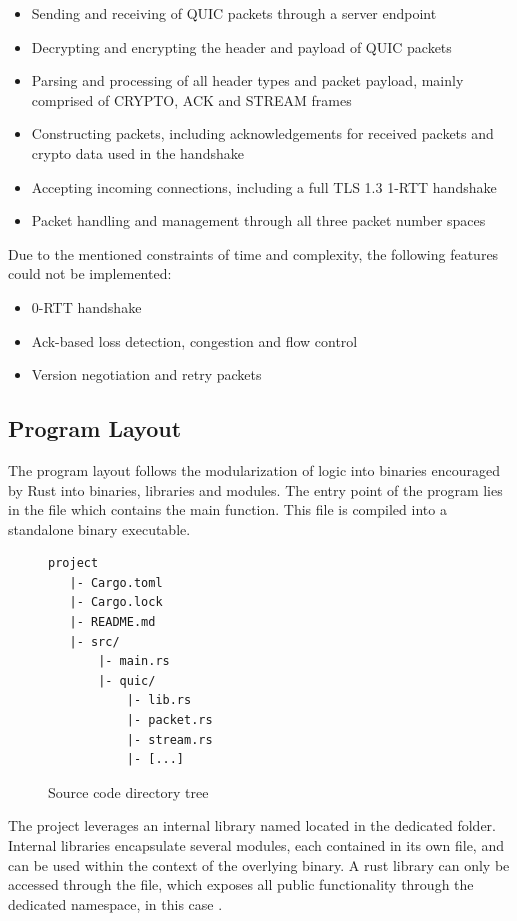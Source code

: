 \begin{itemize}
    \item Sending and receiving of QUIC packets through a server endpoint
    \item Decrypting and encrypting the header and payload of QUIC packets
    \item Parsing and processing of all header types and packet payload, mainly comprised of CRYPTO, ACK and STREAM frames
    \item Constructing packets, including acknowledgements for received packets and crypto data used in the handshake
    \item Accepting incoming connections, including a full TLS 1.3 1-RTT handshake
    \item Packet handling and management through all three packet number spaces
\end{itemize}

Due to the mentioned constraints of time and complexity, the following features could not be implemented:
\begin{itemize}
    \item 0-RTT handshake
    \item Ack-based loss detection, congestion and flow control
    \item Version negotiation and retry packets
\end{itemize} 

\subsection{Program Layout}

The program layout follows the modularization of logic into binaries encouraged by Rust into binaries, libraries and modules.
The entry point of the program lies in the  file which contains the main function. This file is compiled into
a standalone binary executable.

\begin{figure}[htb]
    \centering
\begin{verbatim}
project
   |- Cargo.toml
   |- Cargo.lock
   |- README.md
   |- src/
       |- main.rs
       |- quic/
           |- lib.rs
           |- packet.rs
           |- stream.rs
           |- [...]
\end{verbatim}
    \caption{Source code directory tree}
    \label{source_code_tree}
\end{figure}

The project leverages an internal library named  located in the dedicated  folder.
Internal libraries encapsulate several modules, each contained in its own file, and can be used within the context of the
overlying binary. A rust library can only be accessed through the  file, which exposes all public
functionality through the dedicated namespace, in this case . 

